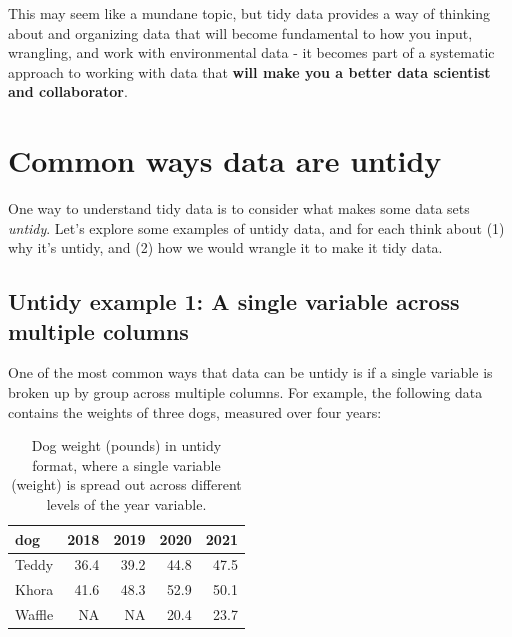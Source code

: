 \documentclass[
]{book}
\begin{document}
This may seem like a mundane topic, but tidy data provides a way of thinking about and organizing data that will become fundamental to how you input, wrangling, and work with environmental data - it becomes part of a systematic approach to working with data that \textbf{will make you a better data scientist and collaborator}.

\hypertarget{common-ways-data-are-untidy}{%
\section{Common ways data are untidy}\label{common-ways-data-are-untidy}}

One way to understand tidy data is to consider what makes some data sets \emph{untidy}. Let's explore some examples of untidy data, and for each think about (1) why it's untidy, and (2) how we would wrangle it to make it tidy data.

\hypertarget{untidy-example-1-a-single-variable-across-multiple-columns}{%
\subsection{Untidy example 1: A single variable across multiple columns}\label{untidy-example-1-a-single-variable-across-multiple-columns}}

One of the most common ways that data can be untidy is if a single variable is broken up by group across multiple columns. For example, the following data contains the weights of three dogs, measured over four years:

\begin{table}

\caption{\label{tab:unnamed-chunk-2}Dog weight (pounds) in untidy format, where a single variable (weight) is spread out across different levels of the year variable.}
\centering
\begin{tabular}[t]{l|r|r|r|r}
\hline
dog & 2018 & 2019 & 2020 & 2021\\
\hline
Teddy & 36.4 & 39.2 & 44.8 & 47.5\\
\hline
Khora & 41.6 & 48.3 & 52.9 & 50.1\\
\hline
Waffle & NA & NA & 20.4 & 23.7\\
\hline
\end{tabular}
\end{table}
\end{document}
